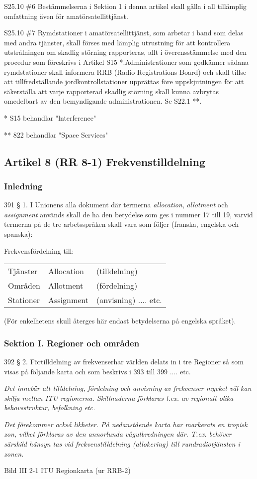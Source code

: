 S25.10 \#6 Bestämmelserna i Sektion 1 i denna artikel skall gälla i all
tillämplig omfattning även för amatörsatellittjänst.

S25.10 \#7 Rymdstationer i amatörsatellittjänst, som arbetar i band som
delas med andra tjänster, skall förses med lämplig utrustning för att
kontrollera utstrålningen om skadlig störning rapporteras, allt i
överensstämmelse med den procedur som föreskrivs i Artikel S15
*.Administrationer som godkänner sådana rymdstationer skall informera
RRB (Radio Registrations Board) och skall tillse att tillfredställande
jordkontrollstationer upprättas före uppskjutningen för att
säkerställa att varje rapporterad skadlig störning skall kunna
avbrytas omedelbart av den bemyndigande administrationen. Se S22.1 **.

* S15 behandlar "lnterference"

** 822 behandlar "Space Services"

\subsection{Artikel 8 (RR 8-1) Frekvenstilldelning}

\subsubsection{Inledning}

391 § 1. I Unionens alla dokument där termerna \emph{allocation},
\emph{allotment} och \emph{assignment} används skall de ha den
betydelse som ges i nummer 17 till 19, varvid termerna på de tre
arbetsspråken skall vara som följer (franska, engelska och spanska):

Frekvensfördelning till:
\begin{tabular}{lll}
  Tjänster & Allocation & (tilldelning) \\
  Områden & Allotment & (fördelning) \\
  Stationer & Assignment & (anvisning) .... etc. \\
\end{tabular}
(För enkelhetens skull återges här endast
betydelserna på engelska språket).

\subsubsection{Sektion I. Regioner och områden}

392 § 2. Förtilldelning av frekvenserhar världen delats in i tre
Regioner så som visas på följande karta och som beskrivs i 393 till
399 .... etc.

\emph{ Det innebär att tilldelning, fördelning och anvisning av
  frekvenser mycket väl kan skilja mellan ITU-regionerna. Skillnaderna
  förklaras t.ex. av regionalt olika behovsstruktur, befolkning etc.}

\emph{Det förekommer också likheter. På nedanstående karta har
  markerats en tropisk zon, vilket förklaras av den annorlunda
  vågutbredningen där. T.ex. behöver särskild hänsyn tas vid
  frekvenstilldelning (allokering) till rundradiotjänsten i zonen.}

Bild III 2-1 ITU Regionkarta (ur RRB-2)
